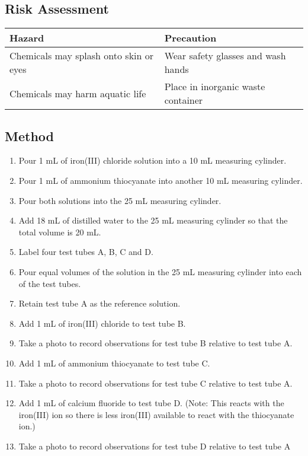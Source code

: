 	\subsection{Risk Assessment}
		\begin{table}[htbp]
			\centering
			\begin{tabular}{l|l}
				\hline
				Hazard & Precaution \\ \hline
				Chemicals may splash onto skin or eyes & Wear safety glasses and wash hands  \\
				Chemicals may harm aquatic life & Place in inorganic waste container \\
			\end{tabular}
		\end{table}

	\subsection{Method}
		\begin{enumerate}
			\item Pour 1 mL of iron(III) chloride solution into a 10 mL measuring cylinder.
			\item Pour 1 mL of ammonium thiocyanate into another 10 mL measuring cylinder.
			\item Pour both solutions into the 25 mL measuring cylinder.
			\item Add 18 mL of distilled water to the 25 mL measuring cylinder so that the total volume is 20 mL.
			\item Label four test tubes A, B, C and D.
			\item Pour equal volumes of the solution in the 25 mL measuring cylinder into each of the test tubes.
			\item Retain test tube A as the reference solution.
			\item Add 1 mL of iron(III) chloride to test tube B.
			\item Take a photo to record observations for test tube B relative to test tube A.
			\item Add 1 mL of ammonium thiocyanate to test tube C.
			\item Take a photo to record observations for test tube C relative to test tube A.
			\item Add 1 mL of calcium fluoride to test tube D. (Note: This reacts with the iron(III) ion so there is less iron(III) available to react with the thiocyanate ion.)
			\item Take a photo to record observations for test tube D relative to test tube A
		\end{enumerate}


